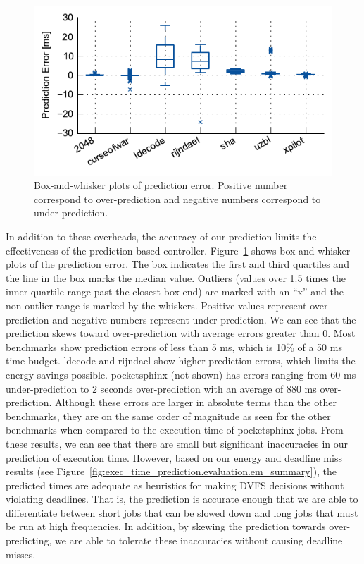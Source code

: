 \begin{figure}
  \begin{center}
    \includegraphics{exec_time_prediction/data/prediction_error.pdf}
    \caption{Box-and-whisker plots of prediction error. Positive number
    correspond to over-prediction and negative numbers correspond to
    under-prediction.}
    \label{fig:exec_time_prediction.evaluation.prediction_error}
  \end{center}
\end{figure}

In addition to these overheads, the accuracy of our prediction limits the
effectiveness of the prediction-based controller.
Figure~\ref{fig:exec_time_prediction.evaluation.prediction_error} shows
box-and-whisker plots of the prediction error.  The box indicates the first and
third quartiles and the line in the box marks the median value. Outliers
(values over 1.5 times the inner quartile range past the closest box end) are
marked with an ``x'' and the non-outlier range is marked by the whiskers.
Positive values represent over-prediction and negative-numbers represent
under-prediction. We can see that the prediction skews toward over-prediction
with average errors greater than 0.  Most benchmarks show prediction errors of
less than 5 ms, which is 10\% of a 50 ms time budget. ldecode and rijndael
show higher prediction errors, which limits the energy savings possible.
pocketsphinx (not shown) has errors ranging from 60 ms under-prediction to 2
seconds over-prediction with an average of 880 ms over-prediction. Although
these errors are larger in absolute terms than the other benchmarks, they are
on the same order of magnitude as seen for the other benchmarks when 
compared to the execution time of pocketsphinx jobs. From these results, we can
see that there are small but significant inaccuracies in our prediction of
execution time.  However, based on our energy and deadline miss results (see
Figure~\ref{fig:exec_time_prediction.evaluation.em_summary}), the predicted
times are adequate as heuristics for making DVFS decisions without violating
deadlines. That is, the prediction is accurate enough that we are able to
differentiate between short jobs that can be slowed down and long jobs that
must be run at high frequencies. In addition, by skewing the prediction towards
over-predicting, we are able to tolerate these inaccuracies without causing
deadline misses. 

